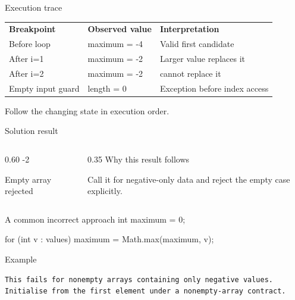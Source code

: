 \documentclass[10pt,aspectratio=169]{beamer}
\begin{document}
\begin{frame}[fragile,t]{Execution trace}
\small\renewcommand{\arraystretch}{1.5}
\begin{tabularx}{\textwidth}{>{\raggedright\arraybackslash}X>{\raggedright\arraybackslash}X>{\raggedright\arraybackslash}X}
\rowcolor{navy}
\color{white}\bfseries Breakpoint & \color{white}\bfseries Observed value & \color{white}\bfseries Interpretation\\
Before loop & maximum = -4 & Valid first candidate\\
After i=1 & maximum = -2 & Larger value replaces it\\
After i=2 & maximum = -2 & -9 cannot replace it\\
Empty input guard & length = 0 & Exception before index access\\
\end{tabularx}
\vspace{3mm}\footnotesize Follow the changing state in execution order.
\end{frame}

\begin{frame}[fragile,t]{Solution result}
\begin{columns}[T,onlytextwidth]\begin{column}{0.60\textwidth}
-2\par Empty array rejected
\end{column}\begin{column}{0.35\textwidth}\small
Why this result follows

Call it for negative-only data and reject the empty case explicitly.
\end{column}\end{columns}
\end{frame}

\begin{frame}[fragile,t]{A common incorrect approach}
int maximum = 0;\par for (int v : values) maximum = Math.max(maximum, v);
\vspace{1mm}\begin{block}{Example}
\begin{lstlisting}
This fails for nonempty arrays containing only negative values. Initialise from the first element under a nonempty-array contract.
\end{lstlisting}
\end{block}
\end{frame}
\end{document}
